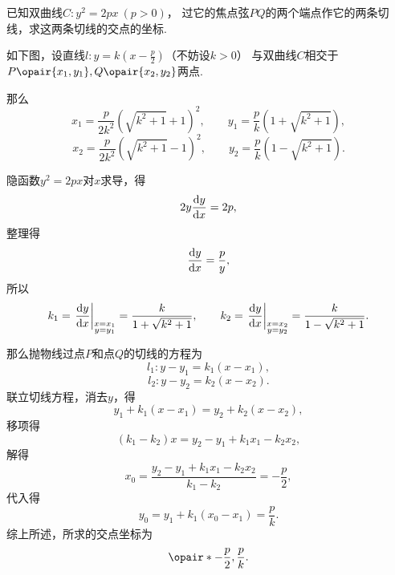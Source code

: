 \begin{example}
已知双曲线\(C: y^2 = 2px\ (p>0)\)，
过它的焦点弦\(PQ\)的两个端点作它的两条切线，求这两条切线的交点的坐标.
\begin{solution}
如下图，设直线\(l: y=k\left(x-\frac{p}{2}\right)\)（不妨设\(k>0\)）
与双曲线\(C\)相交于\(P\opair{x_1,y_1},Q\opair{x_2,y_2}\)两点.
\begin{center}
\end{center}
那么\[
x_1 = \frac{p}{2 k^2} (\sqrt{k^2+1} + 1)^2,
\qquad
y_1 = \frac{p}{k} (1+\sqrt{k^2+1}),
\]\[
x_2 = \frac{p}{2 k^2} (\sqrt{k^2+1} - 1)^2,
\qquad
y_2 = \frac{p}{k} (1-\sqrt{k^2+1}).
\]

隐函数\(y^2 = 2px\)对\(x\)求导，得\[
2 y \dv{y}{x} = 2 p,
\]整理得\[
\dv{y}{x} = \frac{p}{y},
\]所以\[
k_1 = \eval{\dv{y}{x}}_{\substack{x=x_1\\y=y_1}}
= \frac{k}{1+\sqrt{k^2+1}},
\qquad
k_2 = \eval{\dv{y}{x}}_{\substack{x=x_2\\y=y_2}}
= \frac{k}{1-\sqrt{k^2+1}}.
\]

那么抛物线过点\(P\)和点\(Q\)的切线的方程为\[
l_1: y-y_1 = k_1 (x-x_1),
\]\[
l_2: y-y_2 = k_2 (x-x_2).
\]联立切线方程，消去\(y\)，得\[
y_1 + k_1(x - x_1) = y_2 + k_2(x - x_2),
\]移项得\[
(k_1 - k_2) x = y_2 - y_1 + k_1 x_1 - k_2 x_2,
\]解得\[
x_0 = \frac{y_2 - y_1 + k_1 x_1 - k_2 x_2}{k_1 - k_2}
= -\frac{p}{2},
\]代入得\[
y_0 = y_1 + k_1(x_0 - x_1)
= \frac{p}{k}.
\]综上所述，所求的交点坐标为\[
\opair*{-\frac{p}{2},\frac{p}{k}}.
\]
\end{solution}
\end{example}

